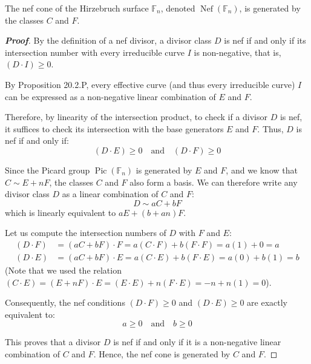 \begin{proposition}[20.2.S]
The nef cone of the Hirzebruch surface $\mathbb{F}_n$, denoted $\operatorname{Nef}(\mathbb{F}_n)$, is generated by the classes $C$ and $F$.
\end{proposition}

\begin{proof}[\textbf{Proof}]
By the definition of a nef divisor, a divisor class $D$ is nef if and only if its intersection number with every irreducible curve $I$ is non-negative, that is, $(D \cdot I) \ge 0$.

By Proposition 20.2.P, every effective curve (and thus every irreducible curve) $I$ can be expressed as a non-negative linear combination of $E$ and $F$. 

Therefore, by linearity of the intersection product, to check if a divisor $D$ is nef, it suffices to check its intersection with the base generators $E$ and $F$. Thus, $D$ is nef if and only if:
\[
(D \cdot E) \ge 0 \quad \text{and} \quad (D \cdot F) \ge 0
\]

Since the Picard group $\operatorname{Pic}(\mathbb{F}_n)$ is generated by $E$ and $F$, and we know that $C \sim E + nF$, the classes $C$ and $F$ also form a basis. We can therefore write any divisor class $D$ as a linear combination of $C$ and $F$:
\[
D \sim aC + bF
\]
which is linearly equivalent to $aE + (b+an)F$. 

Let us compute the intersection numbers of $D$ with $F$ and $E$:
\begin{align*}
(D \cdot F) &= (aC + bF) \cdot F = a(C \cdot F) + b(F \cdot F) = a(1) + 0 = a \\
(D \cdot E) &= (aC + bF) \cdot E = a(C \cdot E) + b(F \cdot E) = a(0) + b(1) = b
\end{align*}
(Note that we used the relation $(C \cdot E) = (E + nF) \cdot E = (E \cdot E) + n(F \cdot E) = -n + n(1) = 0$).

Consequently, the nef conditions $(D \cdot F) \ge 0$ and $(D \cdot E) \ge 0$ are exactly equivalent to:
\[
a \ge 0 \quad \text{and} \quad b \ge 0
\]

This proves that a divisor $D$ is nef if and only if it is a non-negative linear combination of $C$ and $F$. Hence, the nef cone is generated by $C$ and $F$.
\end{proof}